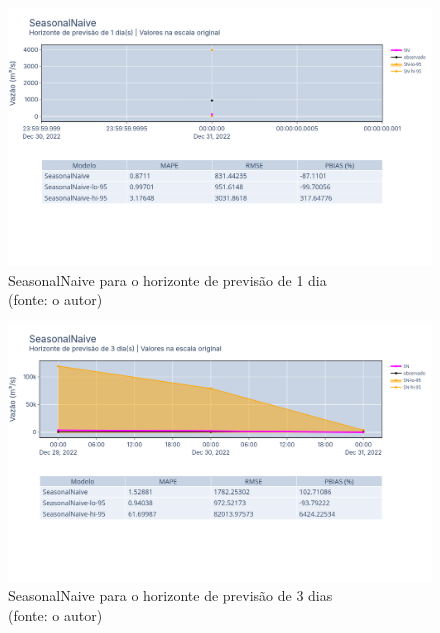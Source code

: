 \begin{figure}[!h]
	\centering
	\includegraphics[scale=0.33]{Figuras/jequiti/resultados/SeasonalNaive_fh1.png}
	\caption{SeasonalNaive para o horizonte de previsão de 1 dia\\(fonte: o autor)}
	\label{fig:jequiti_SeasonalNaive_fh1}
\end{figure}

\begin{figure}[!h]
	\centering
	\includegraphics[scale=0.33]{Figuras/jequiti/resultados/SeasonalNaive_fh3.png}
	\caption{SeasonalNaive para o horizonte de previsão de 3 dias\\(fonte: o autor)}
	\label{fig:jequiti_SeasonalNaive_fh3}
\end{figure}

